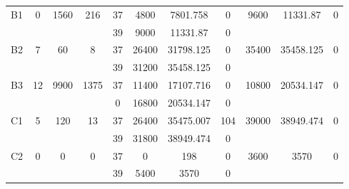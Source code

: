 \begin{sidewaystable}
\begin{tabular}{c||c|c|c||c|c|c|c||c|c|c}
        
      \\
      \hline
      \multirow{2}{*}{B1} &
      \multirow{2}{*}{0} &
      \multirow{2}{*}{1560} &
      \multirow{2}{*}{216} &
      37 &
      4800 &
        7801.758 &
        0 &
      \multirow{2}{*}{9600} &
        \multirow{2}{*}{11331.87} &
        \multirow{2}{*}{0}
      \\
      \cline{5-8}
       &
       &
       &
       &
      39 &
      9000 &
        11331.87 &
        0 &
      
         &
        
      \\
      \hline
      \multirow{2}{*}{B2} &
      \multirow{2}{*}{7} &
      \multirow{2}{*}{60} &
      \multirow{2}{*}{8} &
      37 &
      26400 &
        31798.125 &
        0 &
      \multirow{2}{*}{35400} &
        \multirow{2}{*}{35458.125} &
        \multirow{2}{*}{0}
      \\
      \cline{5-8}
       &
       &
       &
       &
      39 &
      31200 &
        35458.125 &
        0 &
      
         &
        
      \\
      \hline
      \multirow{2}{*}{B3} &
      \multirow{2}{*}{12} &
      \multirow{2}{*}{9900} &
      \multirow{2}{*}{1375} &
      37 &
      11400 &
        17107.716 &
        0 &
      \multirow{2}{*}{10800} &
        \multirow{2}{*}{20534.147} &
        \multirow{2}{*}{0}
      \\
      \cline{5-8}
       &
       &
       &
       &
      0 &
      16800 &
        20534.147 &
        0 &
      
         &
        
      \\
      \hline
      \multirow{2}{*}{C1} &
      \multirow{2}{*}{5} &
      \multirow{2}{*}{120} &
      \multirow{2}{*}{13} &
      37 &
      26400 &
        35475.007 &
        104 &
      \multirow{2}{*}{39000} &
        \multirow{2}{*}{38949.474} &
        \multirow{2}{*}{0}
      \\
      \cline{5-8}
       &
       &
       &
       &
      39 &
      31800 &
        38949.474 &
        0 &
      
         &
        
      \\
      \hline
      \multirow{2}{*}{C2} &
      \multirow{2}{*}{0} &
      \multirow{2}{*}{0} &
      \multirow{2}{*}{0} &
      37 &
      0 &
        198 &
        0 &
      \multirow{2}{*}{3600} &
        \multirow{2}{*}{3570} &
        \multirow{2}{*}{0}
      \\
      \cline{5-8}
       &
       &
       &
       &
      39 &
      5400 &
        3570 &
        0 &
      

\end{tabular}
\end{sidewaystable}
